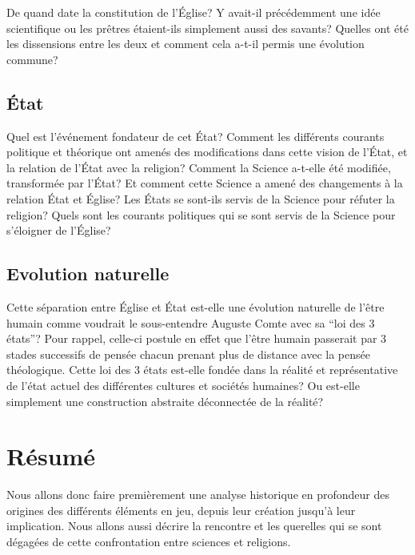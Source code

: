 \documentclass{article}
\begin{document}
De quand date la constitution de l'Église? Y avait-il précédemment une idée
scientifique ou les prêtres étaient-ils simplement aussi des savants? Quelles ont été les
dissensions entre les deux et comment cela a-t-il permis une évolution commune?

\subsection{État}

Quel est l'événement fondateur de cet État? Comment les différents courants
politique et théorique ont amenés des modifications dans cette vision de l'État,
et la relation de l'État avec la religion? Comment la Science a-t-elle été modifiée,
transformée par l'État? Et comment cette Science a amené des changements à la
relation État et Église? Les États se sont-ils servis de la Science pour
réfuter la religion? Quels sont les courants politiques qui se sont servis de la
Science pour s'éloigner de l'Église?

\subsection{Evolution naturelle}

Cette séparation entre Église et État est-elle une évolution naturelle
de l'être humain comme voudrait le sous-entendre Auguste Comte avec sa
``loi des 3 états''? Pour rappel, celle-ci postule en effet que l'être humain
passerait par 3 stades successifs de pensée chacun prenant plus de
distance avec la pensée théologique. Cette loi des 3 états est-elle
fondée dans la réalité et représentative de l'état actuel des
différentes cultures et sociétés humaines? Ou est-elle simplement une
construction abstraite déconnectée de la réalité?

\section{Résumé}

Nous allons donc faire premièrement une analyse historique en profondeur des
origines des différents éléments en jeu, depuis leur création jusqu'à
leur implication. Nous allons aussi décrire la rencontre et les
querelles qui se sont dégagées de cette confrontation entre sciences et religions.
\end{document}
